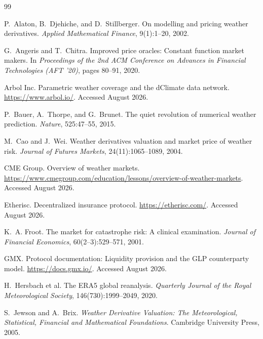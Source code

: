 \documentclass[11pt,a4paper]{article}
\begin{document}
\newpage
\begin{thebibliography}{99}
\small
\setlength{\itemsep}{4pt}

P.~Alaton, B.~Djehiche, and D.~Stillberger.
\newblock On modelling and pricing weather derivatives.
\newblock \emph{Applied Mathematical Finance}, 9(1):1--20, 2002.

G.~Angeris and T.~Chitra.
\newblock Improved price oracles: Constant function market makers.
\newblock In \emph{Proceedings of the 2nd ACM Conference on Advances in Financial
Technologies (AFT '20)}, pages 80--91, 2020.

Arbol Inc.
\newblock Parametric weather coverage and the dClimate data network.
\newblock \url{https://www.arbol.io/}. Accessed August 2026.

P.~Bauer, A.~Thorpe, and G.~Brunet.
\newblock The quiet revolution of numerical weather prediction.
\newblock \emph{Nature}, 525:47--55, 2015.

M.~Cao and J.~Wei.
\newblock Weather derivatives valuation and market price of weather risk.
\newblock \emph{Journal of Futures Markets}, 24(11):1065--1089, 2004.

CME Group.
\newblock Overview of weather markets.
\newblock \url{https://www.cmegroup.com/education/lessons/overview-of-weather-markets}.
Accessed August 2026.

Etherisc.
\newblock Decentralized insurance protocol.
\newblock \url{https://etherisc.com/}. Accessed August 2026.

K.~A. Froot.
\newblock The market for catastrophe risk: A clinical examination.
\newblock \emph{Journal of Financial Economics}, 60(2--3):529--571, 2001.

GMX.
\newblock Protocol documentation: Liquidity provision and the GLP counterparty model.
\newblock \url{https://docs.gmx.io/}. Accessed August 2026.

H.~Hersbach et al.
\newblock The ERA5 global reanalysis.
\newblock \emph{Quarterly Journal of the Royal Meteorological Society},
146(730):1999--2049, 2020.

S.~Jewson and A.~Brix.
\newblock \emph{Weather Derivative Valuation: The Meteorological, Statistical, Financial and
Mathematical Foundations}.
\newblock Cambridge University Press, 2005.


\end{thebibliography}
\end{document}
